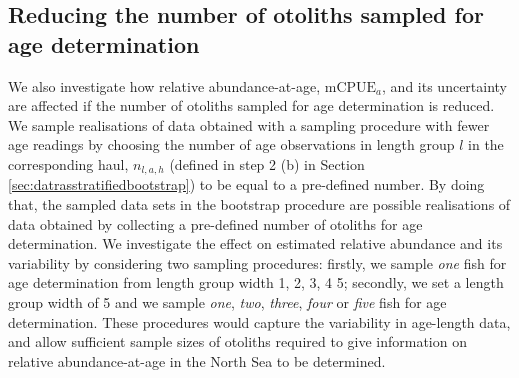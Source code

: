 \documentclass[a4paper 12pt]{article}
\numberwithin{equation}{section}
\begin{document}
\subsection{Reducing the number of otoliths sampled for age determination}
\label{sec:reducingeffort}
We also investigate how relative abundance-at-age, $\text{mCPUE}_a$, and its uncertainty are affected if the  number of otoliths sampled for age determination is reduced. We sample realisations of data obtained with a sampling procedure with fewer age readings by choosing the number of age observations in length group $l$ in the corresponding haul,  $n_{l,a,h}$ (defined in step 2 (b) in Section \ref{sec:datrasstratifiedbootstrap}) to be equal to a pre-defined number. By doing that, the sampled data sets in the bootstrap procedure are possible realisations of data obtained by collecting a pre-defined number of otoliths for age determination. We investigate the effect on estimated relative abundance and its variability by considering two sampling procedures: firstly,  we sample \textit{one} fish for age determination from length group width 1, 2, 3, 4 5; secondly, we set a length group width of 5 and we sample \textit{one}, \textit{two}, \textit{three}, \textit{four} or \textit{five} fish for age determination. These procedures would capture the variability in age-length data, and allow sufficient sample sizes of otoliths required to give information on relative abundance-at-age in the North Sea to be determined. 
\end{document}
